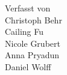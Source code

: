 \begin{titlepage}
	\begin{center}
		Verfasst von \\[3ex]
		Christoph Behr \\
		Cailing Fu \\
		Nicole Grubert \\
		Anna Pryadun \\
		Daniel Wolff \\
	\end{center}
	
	\restoregeometry
	
\end{titlepage}